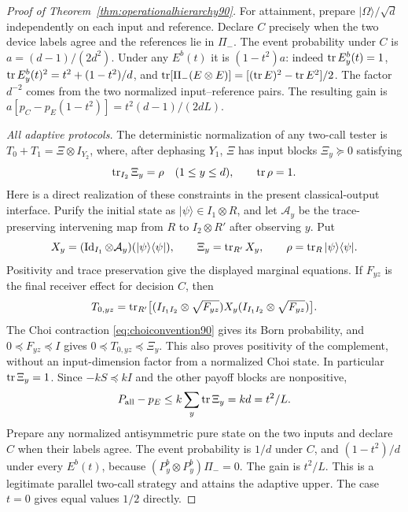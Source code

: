 \begin{proof}[Proof of Theorem~\ref{thm:operationalhierarchy90}]
For attainment, prepare $|\Omega\rangle/\sqrt d$ independently on each
input and reference.  Declare $C$ precisely when the two device labels
agree and the references lie in $\Pi_-$.  The event probability under
$C$ is $a=(d-1)/(2d^2)$.  Under any $E^b(t)$ it is $(1-t^2)a$:
indeed $\operatorname{tr} E_y^b(t)=1$, $\operatorname{tr} E_y^b(t)^2=t^2+(1-t^2)/d$, and
$\operatorname{tr}[\Pi_-(E\otimes E)]=[(\operatorname{tr} E)^2-\operatorname{tr} E^2]/2$.
The factor $d^{-2}$ comes from the two normalized input--reference
pairs.  The resulting gain is
$a[p_C-p_E(1-t^2)]=t^2(d-1)/(2dL)$.

\emph{All adaptive protocols.}
The deterministic normalization of any two-call tester is
$T_0+T_1=\Xi\otimes I_{Y_2}$, where, after dephasing $Y_1$,
$\Xi$ has input blocks $\Xi_y\succeq0$ satisfying
\[
 \operatorname{tr}_{I_2}\Xi_y=\rho\quad(1\le y\le d),\qquad \operatorname{tr}\rho=1.
\]
Here is a direct realization of these constraints in the present
classical-output interface.  Purify the initial state as
$|\psi\rangle\in I_1\otimes R$, and let $\mathcal A_y$ be the
trace-preserving intervening map from $R$ to $I_2\otimes R'$ after
observing $y$.  Put
\[
 X_y=(\operatorname{Id}_{I_1}\otimes\mathcal A_y)
                 (|\psi\rangle\langle\psi|),\qquad
 \Xi_y=\operatorname{tr}_{R'}X_y,\qquad
 \rho=\operatorname{tr}_R|\psi\rangle\langle\psi|.
\]
Positivity and trace preservation give the displayed marginal equations.
If $F_{yz}$ is the final receiver effect for decision $C$, then
\[
 T_{0,yz}=\operatorname{tr}_{R'}\bigl[(I_{I_1I_2}\otimes\sqrt{F_{yz}})
           X_y(I_{I_1I_2}\otimes\sqrt{F_{yz}})\bigr].
\]
The Choi contraction \eqref{eq:choiconvention90} gives its Born
probability, and $0\preceq F_{yz}\preceq I$ gives
$0\preceq T_{0,yz}\preceq\Xi_y$.  This also proves positivity of the
complement, without an input-dimension factor from a normalized Choi
state.  In particular $\operatorname{tr}\Xi_y=1$.
Since $-kS\preceq kI$ and the other payoff blocks are nonpositive,
\[
 P_{\rm all}-p_E\le k\sum_y\operatorname{tr}\Xi_y=kd=t^2/L.
\]
Prepare any normalized antisymmetric pure state on the two inputs and
declare $C$ when their labels agree.  The event probability is $1/d$
under $C$, and $(1-t^2)/d$ under every $E^b(t)$, because
$(P_y^b\otimes P_y^b)\Pi_-=0$.  The gain is $t^2/L$.
This is a legitimate parallel two-call strategy and attains the
adaptive upper.  The case $t=0$ gives equal values $1/2$ directly.
\end{proof}

